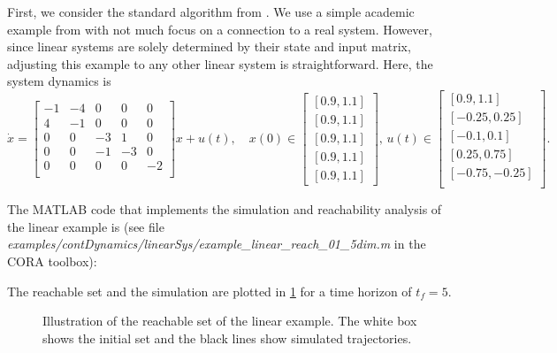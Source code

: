 First, we consider the standard algorithm from \cite{Girard2005}. We use a simple academic example from \cite[Sec.~3.2.3]{Althoff2010a} with not much focus on a connection to a real system. However, since linear systems are solely determined by their state and input matrix, adjusting this example to any other linear system is straightforward. Here, the system dynamics is
\begin{equation*}
    \dot{x}=\begin{bmatrix}
                -1 & -4 & 0  & 0  & 0  \\
                4  & -1 & 0  & 0  & 0  \\
                0  & 0  & -3 & 1  & 0  \\
                0  & 0  & -1 & -3 & 0  \\
                0  & 0  & 0  & 0  & -2 \\
    \end{bmatrix}  x + u(t), \quad
    x(0)\in\begin{bmatrix} [0.9,1.1]
               \\ [0.9,1.1] \\ [0.9,1.1] \\ [0.9,1.1] \\ [0.9,1.1]
    \end{bmatrix}, \,
    u(t) \in
    \begin{bmatrix}
    [0.9,1.1]
        \\
        [-0.25,0.25] \\
        [-0.1,0.1] \\
        [0.25,0.75] \\
        [-0.75,-0.25] \\
    \end{bmatrix}.
\end{equation*}

The MATLAB code that implements the simulation and reachability analysis of the linear example is (see file \textit{examples/contDynamics/linearSys/example\_linear\_reach\_01\_5dim.m} in the CORA toolbox):
    {\small
}

The reachable set and the simulation are plotted in \cref{fig:example_linear_reach_01_5dim} for a time horizon of $t_f = 5$.

\begin{figure}[htb]
    \centering
    \footnotesize
    \caption{Illustration of the reachable set of the linear example. The white box shows the initial set and the black lines show simulated trajectories.}
    \label{fig:example_linear_reach_01_5dim}
\end{figure}

